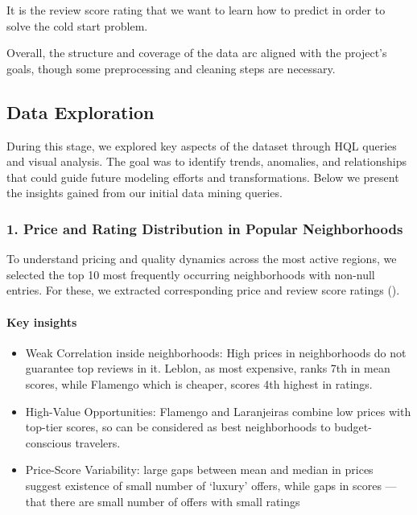 It is the review score rating that we want to learn how to predict in order to solve the cold start problem.

Overall, the structure and coverage of the data arc aligned with the project's goals, though some preprocessing and cleaning steps are necessary.

\subsection{Data Exploration}\label{sec:dataExploration}

During this stage, we explored key aspects of the dataset through HQL queries and visual analysis. The goal was to identify trends, anomalies, and relationships that could guide future modeling efforts and transformations. Below we present the insights gained from our initial data mining queries.

\subsubsection*{1. Price and Rating Distribution in Popular Neighborhoods}

To understand pricing and quality dynamics across the most active regions, we selected the top 10 most frequently occurring neighborhoods with non-null entries. For these, we extracted corresponding price and review score ratings ().

\vspace{0.5em}
\paragraph{Key insights}
\begin{itemize}
    \item Weak Correlation inside neighborhoods: High prices in neighborhoods do not guarantee top reviews in it. Leblon, as most expensive, ranks 7th in mean scores, while Flamengo which is cheaper, scores 4th highest in ratings.
    \item High-Value Opportunities: Flamengo and Laranjeiras combine low prices with top-tier scores, so can be considered as best neighborhoods to budget-conscious travelers.
    \item Price-Score Variability: large gaps between mean and median in prices suggest existence of small number of `luxury' offers, while gaps in scores --- that there are small number of offers with small ratings
\end{itemize}


